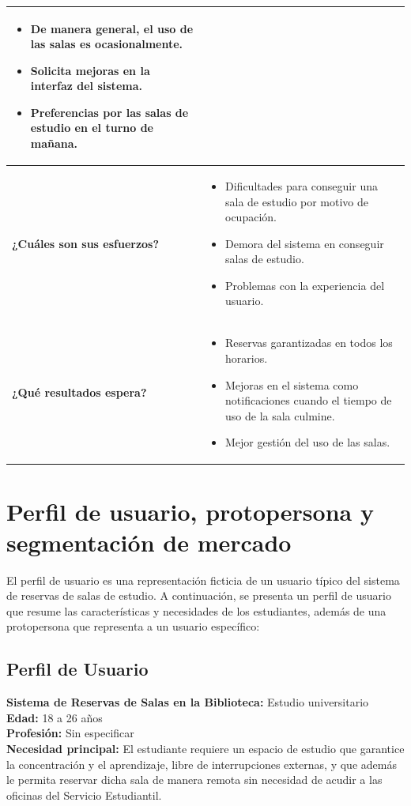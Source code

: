 \documentclass{article}
\begin{document}
\begin{center}
\begin{tabular}{|>{\centering\arraybackslash}m{3cm}|>{\centering\arraybackslash}p{11cm}|}
\begin{itemize}[leftmargin=*, label={--}]
      \item De manera general, el uso de las salas es ocasionalmente.
      \item Solicita mejoras en la interfaz del sistema.
      \item Preferencias por las salas de estudio en el turno de mañana.
    \end{itemize} \\ \hline
    \textbf{¿Cuáles son sus esfuerzos?} & 
    \begin{itemize}[leftmargin=*, label={--}]
      \item Dificultades para conseguir una sala de estudio por motivo de ocupación.
      \item Demora del sistema en conseguir salas de estudio.
      \item Problemas con la experiencia del usuario.
    \end{itemize} \\ \hline
    \textbf{¿Qué resultados espera?} & 
    \begin{itemize}[leftmargin=*, label={--}]
      \item Reservas garantizadas en todos los horarios.
      \item Mejoras en el sistema como notificaciones cuando el tiempo de uso de la sala culmine.
      \item Mejor gestión del uso de las salas.
    \end{itemize} \\ \hline
  \end{tabular}
\end{center}

\newpage

\section{Perfil de usuario, protopersona y segmentación de mercado}

El perfil de usuario es una representación ficticia de un usuario típico del sistema de reservas de salas de estudio. A continuación, se presenta un perfil de usuario que resume las características y necesidades de los estudiantes, además de una protopersona que representa a un usuario específico:

\subsection{Perfil de Usuario}

\textbf{Sistema de Reservas de Salas en la Biblioteca:} Estudio universitario \\
\textbf{Edad:} 18 a 26 años \\
\textbf{Profesión:} Sin especificar \\
\textbf{Necesidad principal:} El estudiante requiere un espacio de estudio que garantice la concentración y el aprendizaje, libre de interrupciones externas, y que además le permita reservar dicha sala de manera remota sin necesidad de acudir a las oficinas del Servicio Estudiantil.
\end{document}
